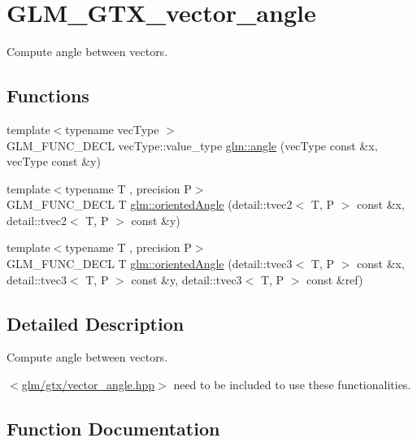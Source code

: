 \hypertarget{group__gtx__vector__angle}{}\section{G\+L\+M\+\_\+\+G\+T\+X\+\_\+vector\+\_\+angle}
\label{group__gtx__vector__angle}


Compute angle between vectors.  


\subsection*{Functions}
\begin{DoxyCompactItemize}
\item 
{\footnotesize template$<$typename vec\+Type $>$ }\\G\+L\+M\+\_\+\+F\+U\+N\+C\+\_\+\+D\+E\+CL vec\+Type\+::value\+\_\+type \hyperlink{group__gtx__vector__angle_gab8691008a2536b681b711211816c14f7}{glm\+::angle} (vec\+Type const \&x, vec\+Type const \&y)
\item 
{\footnotesize template$<$typename T , precision P$>$ }\\G\+L\+M\+\_\+\+F\+U\+N\+C\+\_\+\+D\+E\+CL T \hyperlink{group__gtx__vector__angle_ga6f9cbae1b02b49ad92a1d0070649f038}{glm\+::oriented\+Angle} (detail\+::tvec2$<$ T, P $>$ const \&x, detail\+::tvec2$<$ T, P $>$ const \&y)
\item 
{\footnotesize template$<$typename T , precision P$>$ }\\G\+L\+M\+\_\+\+F\+U\+N\+C\+\_\+\+D\+E\+CL T \hyperlink{group__gtx__vector__angle_ga2aefc221dd5ed9fdacc17c28eea76775}{glm\+::oriented\+Angle} (detail\+::tvec3$<$ T, P $>$ const \&x, detail\+::tvec3$<$ T, P $>$ const \&y, detail\+::tvec3$<$ T, P $>$ const \&ref)
\end{DoxyCompactItemize}


\subsection{Detailed Description}
Compute angle between vectors. 

$<$\hyperlink{vector__angle_8hpp}{glm/gtx/vector\+\_\+angle.\+hpp}$>$ need to be included to use these functionalities. 

\subsection{Function Documentation}
